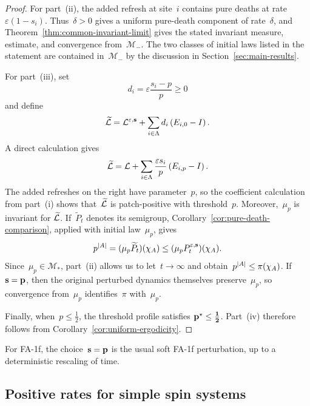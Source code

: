 \begin{proof}
For part~\textup{(ii)}, the added refresh at site~$i$ contains pure deaths at
rate~$\varepsilon(1-s_i)$. Thus~$\delta>0$ gives a uniform pure-death
component of rate~$\delta$, and
Theorem~\ref{thm:common-invariant-limit} gives the stated invariant measure,
estimate, and convergence from~$\mathcal M_-$. The two classes of initial laws
listed in the statement are contained in~$\mathcal M_-$ by the discussion in
Section~\ref{sec:main-results}.

For part~\textup{(iii)}, set
\begin{equation*}
d_i=\varepsilon\frac{s_i-p}{p}\geq0
\end{equation*}
and define
\begin{equation*}
\widetilde{\mathcal{L}}
=
\mathcal{L}^{\varepsilon,\mathbf{s}}
+
\sum_{i\in\Lambda}d_i\left(E_{i,0}-I\right).
\end{equation*}
A direct calculation gives
\begin{equation*}
\widetilde{\mathcal{L}}
=
\mathcal{L}
+
\sum_{i\in\Lambda}
\frac{\varepsilon s_i}{p}\left(E_{i,p}-I\right).
\end{equation*}
The added refreshes on the right have parameter~$p$, so the coefficient
calculation from part~\textup{(i)} shows that~$\widetilde{\mathcal{L}}$ is
patch-positive with threshold~$p$. Moreover,~$\mu_p$ is invariant for
$\widetilde{\mathcal{L}}$. If~$\widetilde P_t$ denotes its semigroup,
Corollary~\ref{cor:pure-death-comparison}, applied with initial law~$\mu_p$,
gives
\begin{equation*}
p^{\left|A\right|}
=
(\mu_p\widetilde P_t)(\chi_A)
\leq
(\mu_pP_t^{\varepsilon,\mathbf{s}})(\chi_A).
\end{equation*}
Since~$\mu_p\in\mathcal M_*$, part~\textup{(ii)} allows us to let~$t\to\infty$
and obtain~$p^{\left|A\right|}\leq\pi(\chi_A)$. If~$\mathbf{s}=\mathbf{p}$, then the original
perturbed dynamics themselves preserve~$\mu_p$, so convergence from~$\mu_p$
identifies~$\pi$ with~$\mu_p$.

Finally, when~$p\leq\frac12$, the threshold profile satisfies
$\mathbf{p}^\star\leq\boldsymbol{\tfrac12}$. Part~\textup{(iv)} therefore follows from
Corollary~\ref{cor:uniform-ergodicity}.
\end{proof}

For FA-1f, the choice~$\mathbf{s}=\mathbf{p}$ is the usual soft FA-1f perturbation, up
to a deterministic rescaling of time.

\begingroup
\subsection{Positive rates for simple spin systems}
\label{subsec:simple-positive-rates}

